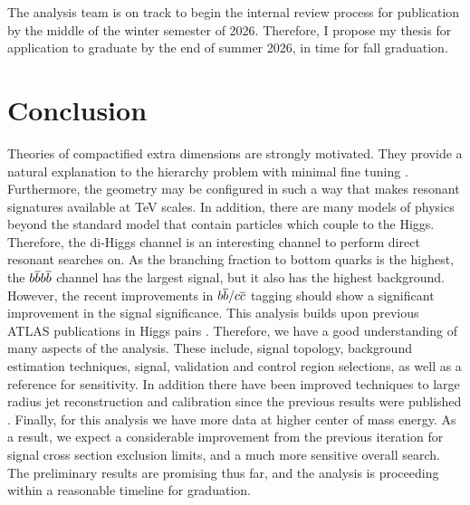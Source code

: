 \documentclass[12pt]{article}
\begin{document}
The analysis team is on track to begin the internal review process for
publication by the middle of the winter semester of 2026. Therefore, I propose
my thesis for application to graduate by the end of summer 2026, in time for
fall graduation.



\section{Conclusion}

Theories of compactified extra dimensions are strongly
motivated. They provide a natural explanation to the hierarchy problem with
minimal fine tuning \cite{RandallSundrumOriginal, bsm}. Furthermore, the
geometry may be configured in such a way that makes resonant signatures
available at TeV scales. In addition, there are many models of physics beyond
the standard model that contain particles which couple to the Higgs. Therefore,
the di-Higgs channel is an interesting channel to perform direct resonant
searches on. As the branching fraction to bottom quarks is the highest, the
$b\overline{b}b\overline{b}$ channel has the largest signal, but it also has the highest
background. However, the recent improvements in $b\overline{b}/c\overline{c}$ tagging should
show a significant improvement in the signal significance. This analysis builds
upon previous ATLAS publications in Higgs pairs \cite{atlas_resonant_2022,
atlas_hhbbbb_vbf}. Therefore, we have a good understanding of many aspects of
the analysis. These include, signal topology, background estimation techniques,
signal, validation and control region selections, as well as a reference for
sensitivity. In addition there have been improved techniques to large radius jet
reconstruction and calibration since the previous results were published
\cite{large_r_jet}. Finally, for this analysis we have more data at higher
center of mass energy. As a result, we expect a considerable improvement from
the previous iteration for signal cross section exclusion limits, and a much
more sensitive overall search. The preliminary results are promising thus far,
and the analysis is proceeding within a reasonable timeline for graduation.


\newpage

% 


\end{document}
